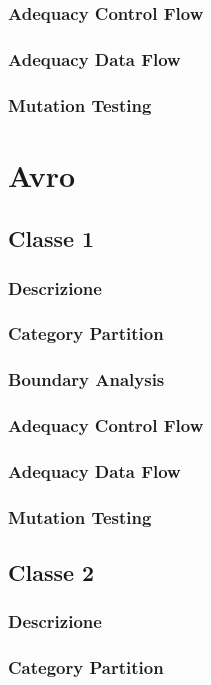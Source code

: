 \documentclass[12pt, a4paper]{article}
\begin{document}
\subsubsection{Adequacy Control Flow}
\subsubsection{Adequacy Data Flow}
\subsubsection{Mutation Testing}

\section{Avro}
\subsection{Classe 1}
\subsubsection{Descrizione}
\subsubsection{Category Partition}
\subsubsection{Boundary Analysis}
\subsubsection{Adequacy Control Flow}
\subsubsection{Adequacy Data Flow}
\subsubsection{Mutation Testing}

\subsection{Classe 2}
\subsubsection{Descrizione}
\subsubsection{Category Partition}
\end{document}
